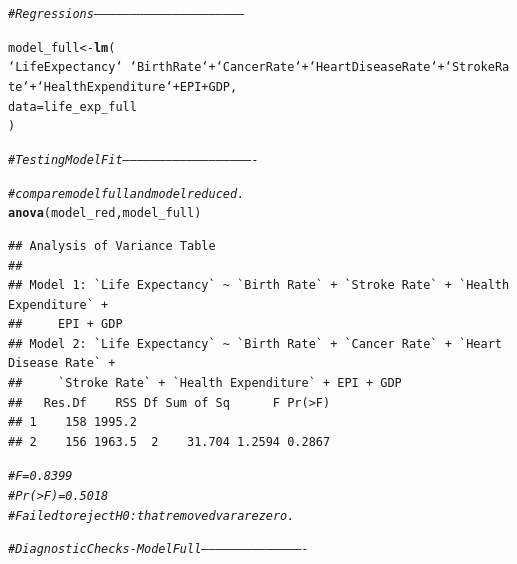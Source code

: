 \documentclass{article}\usepackage[]{graphicx}\usepackage[]{color}
\makeatletter
\newcommand{\hlcom}[1]{\textcolor[rgb]{0.678,0.584,0.686}{\textit{#1}}}%
\newcommand{\hlopt}[1]{\textcolor[rgb]{0,0,0}{#1}}%
\newcommand{\hlstd}[1]{\textcolor[rgb]{0.345,0.345,0.345}{#1}}%
\newcommand{\hlkwb}[1]{\textcolor[rgb]{0.69,0.353,0.396}{#1}}%
\newcommand{\hlkwc}[1]{\textcolor[rgb]{0.333,0.667,0.333}{#1}}%
\newcommand{\hlkwd}[1]{\textcolor[rgb]{0.737,0.353,0.396}{\textbf{#1}}}%
\newenvironment{kframe}{%
 \def\at@end@of@kframe{}%
 \ifinner\ifhmode%
  \def\at@end@of@kframe{\end{minipage}}%
  \begin{minipage}{\columnwidth}%
 \fi\fi%
 \def\FrameCommand##1{\hskip\@totalleftmargin \hskip-\fboxsep
 \colorbox{shadecolor}{##1}\hskip-\fboxsep
     \hskip-\linewidth \hskip-\@totalleftmargin \hskip\columnwidth}%
 \MakeFramed {\advance\hsize-\width
   \@totalleftmargin\z@ \linewidth\hsize
   \@setminipage}}%
 {\par\unskip\endMakeFramed%
 \at@end@of@kframe}
\newenvironment{knitrout}{}{} %
\makeatother
\begin{document}
\begin{knitrout}
{}


\begin{kframe}\begin{alltt}
\hlcom{# Regressions --------------------------------------------------------------}

\hlstd{model_full} \hlkwb{<-} \hlkwd{lm}\hlstd{(}
  \hlstd{`Life Expectancy`} \hlopt{~} \hlstd{`Birth Rate`} \hlopt{+} \hlstd{`Cancer Rate`} \hlopt{+} \hlstd{`Heart Disease Rate`} \hlopt{+} \hlstd{`Stroke Rate`} \hlopt{+}  \hlstd{`Health Expenditure`} \hlopt{+} \hlstd{EPI} \hlopt{+} \hlstd{GDP,}
  \hlkwc{data} \hlstd{= life_exp_full}
\hlstd{)}

\hlcom{# Testing Model Fit -------------------------------------------------------}

\hlcom{# compare model full and model reduced.}
\hlkwd{anova}\hlstd{(model_red, model_full)}
\end{alltt}
\begin{verbatim}
## Analysis of Variance Table
## 
## Model 1: `Life Expectancy` ~ `Birth Rate` + `Stroke Rate` + `Health Expenditure` + 
##     EPI + GDP
## Model 2: `Life Expectancy` ~ `Birth Rate` + `Cancer Rate` + `Heart Disease Rate` + 
##     `Stroke Rate` + `Health Expenditure` + EPI + GDP
##   Res.Df    RSS Df Sum of Sq      F Pr(>F)
## 1    158 1995.2                           
## 2    156 1963.5  2    31.704 1.2594 0.2867
\end{verbatim}
\begin{alltt}
\hlcom{# F = 0.8399}
\hlcom{# Pr(>F) = 0.5018}
\hlcom{# Failed to reject H0: that removed var are zero.}

\hlcom{# Diagnostic Checks - Model Full -------------------------------------------}


\end{alltt}
\end{kframe}
\end{knitrout}
\end{document}
